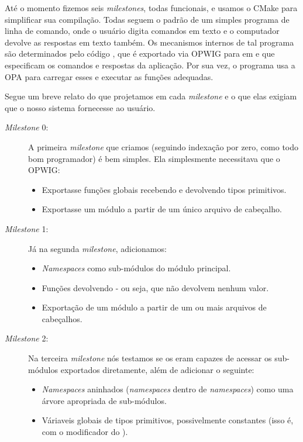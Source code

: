 Até o momento fizemos seis \textit{milestones}, todas funcionais, e usamos o CMake 
para simplificar sua compilação. Todas seguem o padrão de um simples programa de 
linha de comando, onde o usuário digita comandos em texto e o computador devolve
as respostas em texto também. Os mecanismos internos de tal programa são determinados
pelo código \CXX{}, que é exportado via OPWIG para  em  e
 que especificam os comandos e respostas da aplicação. Por sua vez, o
programa usa a OPA para carregar esses  e executar as funções adequadas.

Segue um breve relato do que projetamos em cada \textit{milestone} e o que elas
exigiam que o nosso sistema fornecesse ao usuário.

\begin{description}
  \item[\textit{Milestone} 0:] A primeira \textit{milestone} que criamos (seguindo indexação
    por zero, como todo bom programador) é bem simples. Ela simplesmente necessitava que o
    OPWIG:
    \begin{itemize}
      \item Exportasse funções globais recebendo e devolvendo tipos primitivos.
      \item Exportasse um módulo a partir de um único arquivo de cabeçalho.
    \end{itemize}
    
  \item[\textit{Milestone} 1:] Já na segunda \textit{milestone}, adicionamos:
    \begin{itemize}
      \item \textit{Namespaces} como sub-módulos do módulo principal.
      \item Funções devolvendo  - ou seja, que não devolvem nenhum valor.
      \item Exportação de um módulo a partir de um ou mais arquivos de cabeçalhos.
    \end{itemize}
    
  \item[\textit{Milestone} 2:] Na terceira \textit{milestone} nós testamos se os
     eram capazes de acessar os sub-módulos exportados diretamente, além
    de adicionar o seguinte:
    \begin{itemize}
      \item \textit{Namespaces} aninhados (\textit{namespaces} dentro de \textit{namespaces})
        como uma árvore apropriada de sub-módulos.
      \item Váriaveis globais de tipos primitivos, possivelmente constantes
        (isso é, com o modificador  do \C{}).
    \end{itemize}
    

\end{description}
